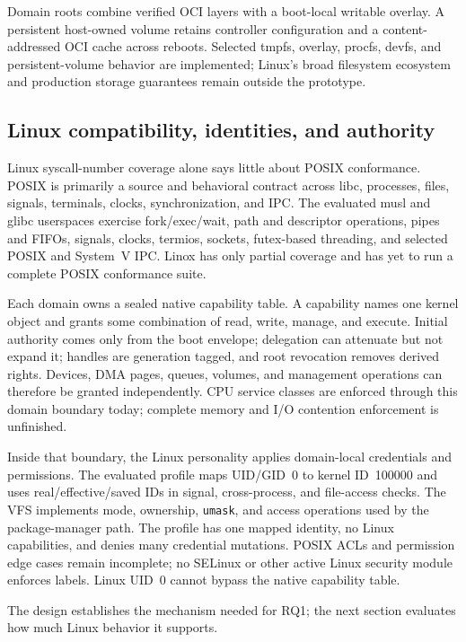 \documentclass[11pt]{article}
\begin{document}
Domain roots combine verified OCI layers with a boot-local writable overlay. A
persistent host-owned volume retains controller configuration and a
content-addressed OCI cache across reboots. Selected tmpfs, overlay, procfs,
devfs, and persistent-volume behavior are implemented; Linux's broad
filesystem ecosystem and production storage guarantees remain outside the
prototype.

\subsection{Linux compatibility, identities, and authority}

Linux syscall-number coverage alone says little about POSIX conformance. POSIX is
primarily a source and behavioral contract across libc, processes, files,
signals, terminals, clocks, synchronization, and IPC. The evaluated musl and
glibc userspaces exercise fork/exec/wait, path and descriptor operations,
pipes and FIFOs, signals, clocks, termios, sockets, futex-based threading, and
selected POSIX and System~V IPC. Linox has only partial coverage and has yet to
run a complete POSIX conformance suite.

Each domain owns a sealed native capability table. A capability names one
kernel object and grants some combination of read, write, manage, and execute.
Initial authority comes only from the boot envelope; delegation can attenuate
but not expand it; handles are generation tagged, and root revocation removes
derived rights. Devices, DMA pages, queues, volumes, and management operations
can therefore be granted independently. CPU service classes are enforced
through this domain boundary today; complete memory and I/O contention
enforcement is unfinished.

Inside that boundary, the Linux personality applies domain-local credentials
and permissions. The evaluated profile maps UID/GID~0 to kernel ID~100000 and
uses real/effective/saved IDs in signal, cross-process, and file-access checks.
The VFS implements mode, ownership, \texttt{umask}, and access operations used
by the package-manager path. The profile has one mapped identity, no Linux
capabilities, and denies many credential mutations. POSIX ACLs and permission
edge cases remain incomplete; no SELinux or other active Linux security module
enforces labels. Linux UID~0 cannot bypass the native capability table.

The design establishes the mechanism needed for RQ1; the next section evaluates
how much Linux behavior it supports.
\end{document}
